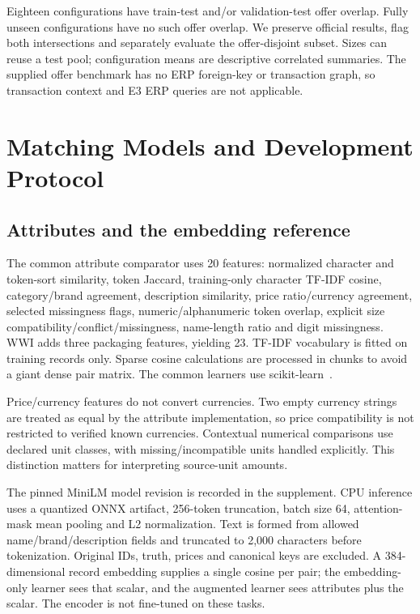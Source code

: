 \documentclass[11pt,letterpaper]{article}
\begin{document}
Eighteen configurations have train-test and/or validation-test offer overlap. Fully unseen configurations have no such offer overlap. We preserve official results, flag both intersections and separately evaluate the offer-disjoint subset. Sizes can reuse a test pool; configuration means are descriptive correlated summaries. The supplied offer benchmark has no ERP foreign-key or transaction graph, so transaction context and E3 ERP queries are not applicable.

\section{Matching Models and Development Protocol}
\subsection{Attributes and the embedding reference}
The common attribute comparator uses 20 features: normalized character and token-sort similarity, token Jaccard, training-only character TF-IDF cosine, category/brand agreement, description similarity, price ratio/currency agreement, selected missingness flags, numeric/alphanumeric token overlap, explicit size compatibility/conflict/missingness, name-length ratio and digit missingness. WWI adds three packaging features, yielding 23. TF-IDF vocabulary is fitted on training records only. Sparse cosine calculations are processed in chunks to avoid a giant dense pair matrix. The common learners use scikit-learn~\cite{sklearn}.

Price/currency features do not convert currencies. Two empty currency strings are treated as equal by the attribute implementation, so price compatibility is not restricted to verified known currencies. Contextual numerical comparisons use declared unit classes, with missing/incompatible units handled explicitly. This distinction matters for interpreting source-unit amounts.

The pinned MiniLM model revision is recorded in the supplement. CPU inference uses a quantized ONNX artifact, 256-token truncation, batch size 64, attention-mask mean pooling and L2 normalization. Text is formed from allowed name/brand/description fields and truncated to 2,000 characters before tokenization. Original IDs, truth, prices and canonical keys are excluded. A 384-dimensional record embedding supplies a single cosine per pair; the embedding-only learner sees that scalar, and the augmented learner sees attributes plus the scalar. The encoder is not fine-tuned on these tasks.
\end{document}
